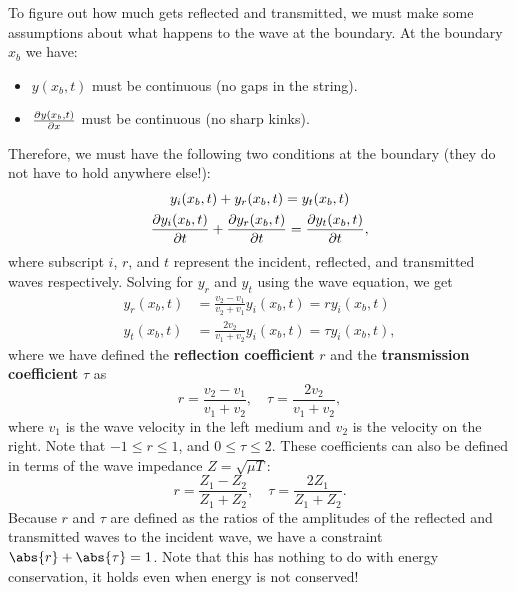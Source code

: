 \documentclass[../classical_mechanics.tex]{subfiles}
\begin{document}
        To figure out how much gets reflected and transmitted, we must make some assumptions about what happens to the wave at the boundary.
        At the boundary $x_b$ we have:
        \begin{itemize}
            \item $y(x_b,t)$ must be continuous (no gaps in the string).
            \item $\pdv{y(x_b,t)}{x}$ must be continuous (no sharp kinks).
        \end{itemize}
        Therefore, we must have the following two conditions at the boundary (they do not have to hold anywhere else!):
        \begin{gather}
            y_i(x_b,t)+y_r(x_b,t)=y_t(x_b,t)\\
            \pdv{y_i(x_b,t)}{t}+\pdv{y_r(x_b,t)}{t}=\pdv{y_t(x_b,t)}{t},
        \end{gather}
        where subscript $i$, $r$, and $t$ represent the incident, reflected, and transmitted waves respectively.
        Solving for $y_r$ and $y_t$ using the wave equation, we get
        \begin{align}
            y_r(x_b,t)&=\frac{v_2-v_1}{v_2+v_1}y_i(x_b,t)=ry_i(x_b,t)\\
            y_t(x_b,t)&=\frac{2v_2}{v_1+v_2}y_i(x_b,t)=\tau y_i(x_b,t),
        \end{align}
        where we have defined the \textbf{reflection coefficient} $r$ and the \textbf{transmission coefficient} $\tau$ as
        \begin{equation}
            r=\frac{v_2-v_1}{v_1+v_2},\quad\tau=\frac{2v_2}{v_1+v_2},
        \end{equation}
        where $v_1$ is the wave velocity in the left medium and $v_2$ is the velocity on the right.
        Note that $-1\leq r\leq 1$, and $0\leq\tau\leq 2$.
        These coefficients can also be defined in terms of the wave impedance $Z=\sqrt{\mu T}$:
        \begin{equation}
            r=\frac{Z_1-Z_2}{Z_1+Z_2},\quad\tau=\frac{2Z_1}{Z_1+Z_2}.
        \end{equation}
        Because $r$ and $\tau$ are defined as the ratios of the amplitudes of the reflected and transmitted waves to the incident wave, we have a constraint $\abs{r}+\abs{\tau}=1$.
        Note that this has nothing to do with energy conservation, it holds even when energy is not conserved!
\end{document}
